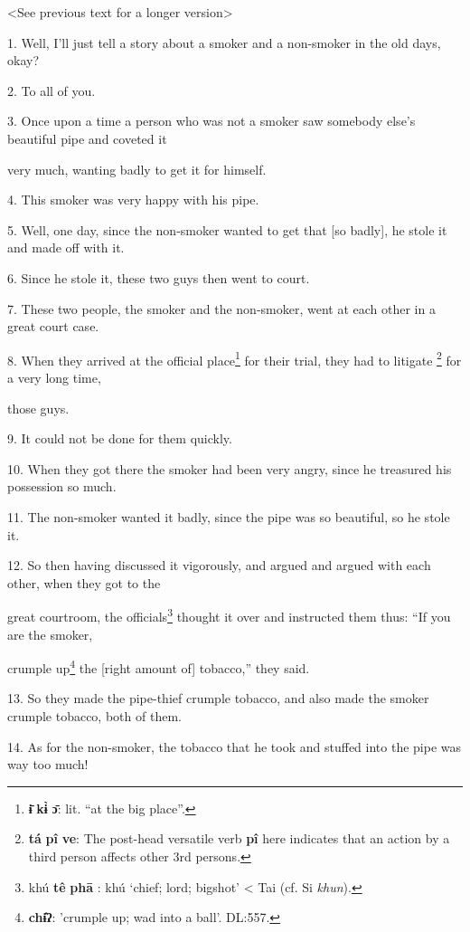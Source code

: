 \setcounter{footnote}{0}

<See previous text for a longer version>

1. Well, I'll just tell a story about a smoker and a non-smoker in the old days,
okay?

2. To all of you.

3. Once upon a time a person who was not a smoker saw somebody else's beautiful
pipe and coveted it

very much, wanting badly to get it for himself.

4. This smoker was very happy with his pipe.

5. Well, one day, since the non-smoker wanted to get that [so badly], he stole
it and made off with it.

6. Since he stole it, these two guys then went to court.

7. These two people, the smoker and the non-smoker, went at each other in a great
court case.

8. When they arrived at the official place\footnote{\textbf{ɨ̄} \textbf{kɨ̀} \textbf{ɔ̄}: lit. ``at the big place''.} for their trial, they had to litigate
\footnote{\textbf{tá} \textbf{pî} \textbf{ve}: The post-head versatile verb \textbf{pî} here indicates that an action by a third person affects other 3rd persons.} for a very long time,

those guys.

9. It could not be done for them quickly.

10. When they got there the smoker had been very angry, since he treasured his
possession so much.

11. The non-smoker wanted it badly, since the pipe was so beautiful, so he stole
it.

12. So then having discussed it vigorously, and argued and argued with each other,
when they got to the

great courtroom, the officials\footnote{khú \textbf{tê} \textbf{phā} : khú `chief; lord; bigshot' < Tai (cf. Si \textit{khun}).} thought it over and instructed them thus: ``If
you are the smoker,

crumple up\footnote{\textbf{chɨ̂ʔ}: 'crumple up; wad into a ball'. DL:557.} the [right amount of] tobacco,'' they said.

13. So they made the pipe-thief crumple tobacco, and also made the smoker crumple
tobacco, both of them.

14. As for the non-smoker, the tobacco that he took and stuffed into the pipe was
way too much!

